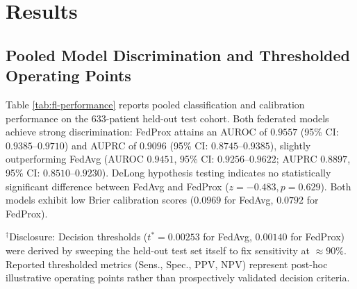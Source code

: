 \documentclass[runningheads]{llncs}
\begin{document}
\section{Results}\label{sec:results}

\subsection{Pooled Model Discrimination and Thresholded Operating Points}
Table \ref{tab:fl-performance} reports pooled classification and calibration performance on the 633-patient held-out test cohort. Both federated models achieve strong discrimination: FedProx attains an AUROC of $0.9557$ (95\% CI: $0.9385$--$0.9710$) and AUPRC of $0.9096$ (95\% CI: $0.8745$--$0.9385$), slightly outperforming FedAvg (AUROC $0.9451$, 95\% CI: $0.9256$--$0.9622$; AUPRC $0.8897$, 95\% CI: $0.8510$--$0.9230$). DeLong hypothesis testing indicates no statistically significant difference between FedAvg and FedProx ($z = -0.483, p = 0.629$). Both models exhibit low Brier calibration scores ($0.0969$ for FedAvg, $0.0792$ for FedProx).

\begin{table}[t]
\caption{Pooled classification performance on held-out test cohort ($N = 633$)}
\label{tab:fl-performance}
\centering
\small
{}
\vspace{1mm}
\raggedright \scriptsize $^\dagger$Disclosure: Decision thresholds ($t^* = 0.00253$ for FedAvg, $0.00140$ for FedProx) were derived by sweeping the held-out test set itself to fix sensitivity at $\approx 90\%$. Reported thresholded metrics (Sens., Spec., PPV, NPV) represent post-hoc illustrative operating points rather than prospectively validated decision criteria.
\end{table}
\end{document}

